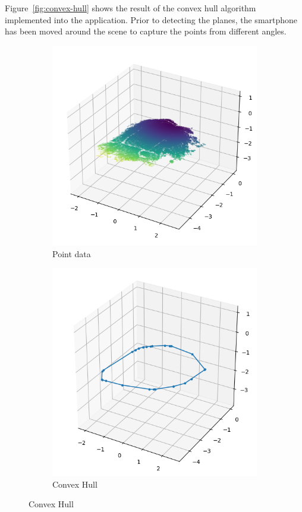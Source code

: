 Figure~\ref{fig:convex-hull} shows the result of the convex hull algorithm implemented into the application.
Prior to detecting the planes, the smartphone has been moved around the scene to capture the points from different angles.

\begin{figure}[ht!]

    \centering
    \begin{subfigure}[b]{0.4\textwidth}
        \centering
        \includegraphics[width=\linewidth]{python/plots/hull/points}
        \caption{Point data}
    \end{subfigure}%
    \begin{subfigure}[b]{0.4\textwidth}
        \centering
        \includegraphics[width=\linewidth]{python/plots/hull/hull}
        \caption{Convex Hull}
    \end{subfigure}%


\end{figure}
